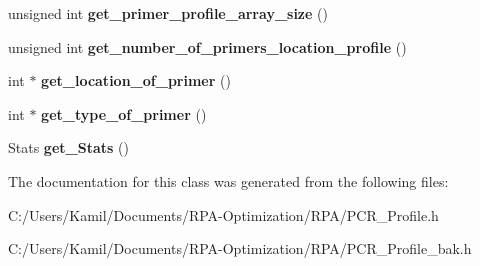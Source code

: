 \begin{DoxyCompactItemize}
unsigned int {\bfseries get\+\_\+primer\+\_\+profile\+\_\+array\+\_\+size} ()
\item 
\mbox{\label{class_p_c_r___profile_a7b3b84627171a22a57366adc1992ff3d}} 
unsigned int {\bfseries get\+\_\+number\+\_\+of\+\_\+primers\+\_\+location\+\_\+profile} ()
\item 
\mbox{\label{class_p_c_r___profile_a7f9b958200413a71f4edd93277da1765}} 
int $\ast$ {\bfseries get\+\_\+location\+\_\+of\+\_\+primer} ()
\item 
\mbox{\label{class_p_c_r___profile_a6243b3536533df498c781f9e592a86db}} 
int $\ast$ {\bfseries get\+\_\+type\+\_\+of\+\_\+primer} ()
\item 
\mbox{\label{class_p_c_r___profile_a05e64bbe69413cb969b31ffae46e6a10}} 
Stats {\bfseries get\+\_\+\+Stats} ()
\end{DoxyCompactItemize}


The documentation for this class was generated from the following files\+:\begin{DoxyCompactItemize}
\item 
C\+:/\+Users/\+Kamil/\+Documents/\+R\+P\+A-\/\+Optimization/\+R\+P\+A/P\+C\+R\+\_\+\+Profile.\+h\item 
C\+:/\+Users/\+Kamil/\+Documents/\+R\+P\+A-\/\+Optimization/\+R\+P\+A/P\+C\+R\+\_\+\+Profile\+\_\+bak.\+h\end{DoxyCompactItemize}
